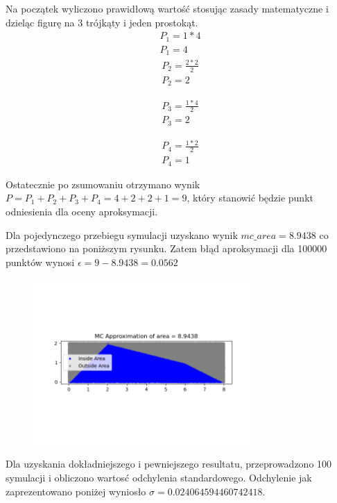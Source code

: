 \documentclass[12pt,oneside,a4paper]{book} %
\theoremstyle{break}
\begin{document}
Na początek wyliczono prawidłową wartość stosując zasady matematyczne i dzieląc figurę na 3 trójkąty i jeden prostokąt.
\begin{gather*}
  P_1 = 1 * 4\\
  P_1 = 4
\end{gather*}
\begin{gather*}
  P_2 = \frac{2 * 2}{2} \\
  P_2 = 2
\end{gather*}

\begin{gather*}
  P_3 = \frac{1 * 4}{2} \\
  P_3 = 2
\end{gather*}

\begin{gather*}
  P_4 = \frac{1 * 2}{2} \\
  P_4 = 1
\end{gather*}

Ostatecznie po zsumowaniu otrzymano wynik $P = P_1 + P_2 + P_3 + P_4 = 4 + 2 + 2 + 1 = 9$, który stanowić będzie punkt odniesienia dla oceny aproksymacji.

Dla pojedynczego przebiegu symulacji uzyskano wynik $mc\_area = 8.9438$ co przedstawiono na poniższym rysunku. Zatem błąd aproksymacji dla 100000 punktów wynosi $\epsilon = 9 - 8.9438 = 0.0562$

\begin{figure}[H]
  \centering
  \includegraphics[width=0.75\textwidth]{area_aproximation_single_run.png}
\end{figure}

Dla uzyskania dokładniejszego i pewniejszego resultatu, przeprowadzono 100 symulacji i obliczono wartosć odchylenia standardowego. Odchylenie jak zaprezentowano poniżej wyniosło $\sigma = 0.024064594460742418$.
\end{document}

